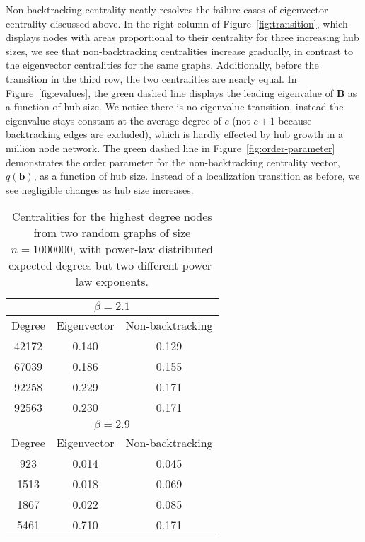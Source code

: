 \documentclass[twocolumn,prl,superscriptaddress]{revtex4}
\newcommand{\mat}{\mathbf}
\renewcommand{\vec}{\mathbf}
\newcommand\colorb{green }
\begin{document}
Non-backtracking centrality neatly resolves the failure cases of eigenvector centrality discussed above. In the right column of Figure~\ref{fig:transition}, which displays nodes with areas proportional to their centrality for three increasing hub sizes, we see that non-backtracking centralities increase gradually, in contrast to the eigenvector centralities for the same graphs. Additionally, before the transition in the third row, the two centralities are nearly equal. In Figure~\ref{fig:evalues}, the \colorb dashed line displays the leading eigenvalue of $\mat{B}$ as a function of hub size. We notice there is no eigenvalue transition, instead the eigenvalue stays constant at the average degree of $c$ (not $c+1$ because backtracking edges are excluded), which is hardly effected by hub growth in a million node network.
The \colorb dashed line in Figure~\ref{fig:order-parameter} demonstrates the order parameter for the non-backtracking centrality vector, $q(\vec{b})$, as a function of hub size. Instead of a localization transition as before, we see negligible changes as hub size increases.

\begin{table}
\centering
\begin{tabular}{|c|c|c|} \hline
\multicolumn{3}{|c|}{$\beta=2.1$} \\ \hline
Degree & Eigenvector & Non-backtracking \\ \hline
42172 & 0.140 & 0.129 \\ \hline
67039 & 0.186 & 0.155 \\ \hline
92258 & 0.229 & 0.171 \\ \hline
92563 & 0.230 & 0.171 \\ \hline \hline
\multicolumn{3}{|c|}{$\beta=2.9$} \\ \hline 
Degree & Eigenvector & Non-backtracking \\ \hline
923  & 0.014 & 0.045 \\ \hline
1513 & 0.018 & 0.069 \\ \hline
1867 & 0.022 & 0.085 \\ \hline
5461 & 0.710 & 0.171 \\ \hline
\end{tabular}
\caption{Centralities for the highest degree nodes from two random graphs of size $n=1000000$, with power-law distributed expected degrees but two different power-law exponents.}
\label{tab:power}
\end{table}
\end{document}
